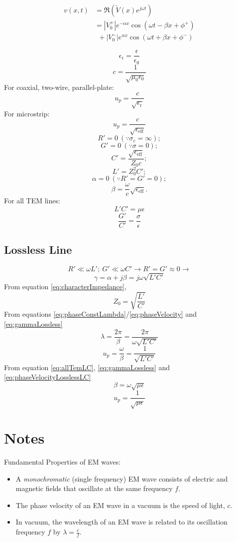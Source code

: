 \documentclass[letterpaper, 10pt]{article}
\begin{document}
\begin{multicols*}{4}
  \[\label{eq:instantVoltage}\begin{aligned}
      v(x, t)&=\Re(\tilde{V}(x)e^{j\omega t}) \\
      &=|V_0^+|e^{-\alpha x}\cos(\omega t - \beta x + \phi^+) \\
      & \ \ +|V_0^-|e^{\alpha x}\cos(\omega t + \beta x + \phi^-)
    \end{aligned}\]

  \[\epsilon_{\text{r}} = \frac{\epsilon}{\epsilon_0}\]
  \[c = \frac{1}{\sqrt{\mu_0 \epsilon_0}}\]
  For coaxial, two-wire, parallel-plate:
  \[u_p = \frac{c}{\sqrt{\epsilon_{\text{r}}}}\]
  For microstrip:
  \[u_p = \frac{c}{\sqrt{\epsilon_{\text{eff}}}}\]
  \[R'=0 \ (\because\sigma_c=\infty); \]
  \[G'=0 \ (\because\sigma=0); \]
  \[C'=\frac{\sqrt{\epsilon_{\text{eff}}}}{Z_0c}; \]
  \[L'=Z_0^2C';\]
  \[\alpha=0 \ (\because R'=G'=0);\]
  \[\beta = \frac{\omega}{c}\sqrt{\epsilon_{\text{eff}}}. \]
  For all TEM lines:
  \[\label{eq:allTemLC}L'C'=\mu\epsilon\]
  \[\frac{G'}{C'}=\frac{\sigma}{\epsilon}\]
  
  \subsection{Lossless Line}
  \[R' \ll \omega L'; \ G' \ll \omega C' \to R'=G'\approx 0 \to\]
  \[\label{eq:gammaLossless}\gamma=\alpha+j\beta=j\omega\sqrt{L'C'}\]
  From equation \eqref{eq:characterImpedance},
  \[Z_0=\sqrt{\frac{L'}{C'}}\]
  From equations \eqref{eq:phaseConstLambda}/\eqref{eq:phaseVelocity} and \eqref{eq:gammaLossless}
  \[\label{eq:lambdaLossless}\lambda=\frac{2\pi}{\beta}=\frac{2\pi}{\omega\sqrt{L'C'}}\]
  \[\label{eq:phaseVelocityLosslessLC}u_p=\frac{\omega}{\beta}=\frac{1}{\sqrt{L'C'}}\]
  From equation \eqref{eq:allTemLC}, \eqref{eq:gammaLossless} and \eqref{eq:phaseVelocityLosslessLC}
  \[\beta=\omega\sqrt{\mu\epsilon}\]
  \[u_p=\frac{1}{\sqrt{\mu\epsilon}}\]
  \section{Notes}

  Fundamental Properties of EM waves:
  \begin{itemize}[nosep]
  \item A \textit{monochromatic} (single frequency) EM wave
    consists of electric and magnetic fields that oscillate at the
    same frequency $f$.
  \item The phase velocity of an EM wave in a vacuum is the speed
    of light, $c$.
  \item In vacuum, the wavelength of an EM wave is related to its
    oscillation frequency $f$ by $\lambda = \frac{c}{f}$.
  \end{itemize}


\end{multicols*}
\end{document}
